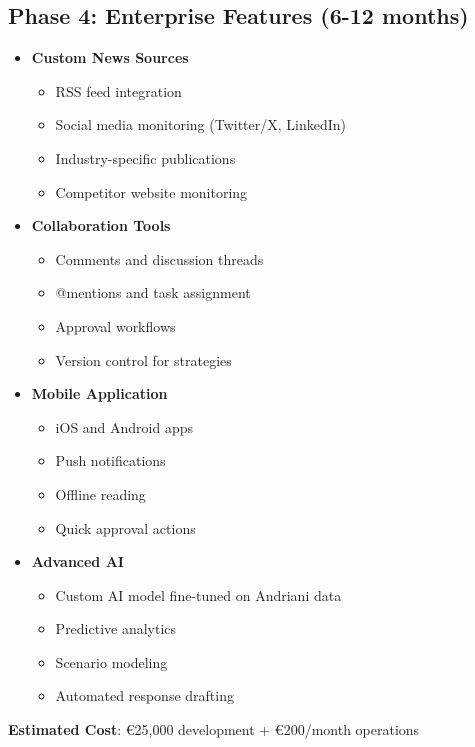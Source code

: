 \documentclass[11pt,a4paper]{article}
\begin{document}
\subsection{Phase 4: Enterprise Features (6-12 months)}
\begin{itemize}[leftmargin=*]
    \item \textbf{Custom News Sources}
    \begin{itemize}
        \item RSS feed integration
        \item Social media monitoring (Twitter/X, LinkedIn)
        \item Industry-specific publications
        \item Competitor website monitoring
    \end{itemize}
    
    \item \textbf{Collaboration Tools}
    \begin{itemize}
        \item Comments and discussion threads
        \item @mentions and task assignment
        \item Approval workflows
        \item Version control for strategies
    \end{itemize}
    
    \item \textbf{Mobile Application}
    \begin{itemize}
        \item iOS and Android apps
        \item Push notifications
        \item Offline reading
        \item Quick approval actions
    \end{itemize}
    
    \item \textbf{Advanced AI}
    \begin{itemize}
        \item Custom AI model fine-tuned on Andriani data
        \item Predictive analytics
        \item Scenario modeling
        \item Automated response drafting
    \end{itemize}
\end{itemize}

\textbf{Estimated Cost}: \euro 25,000 development + \euro 200/month operations
\end{document}
